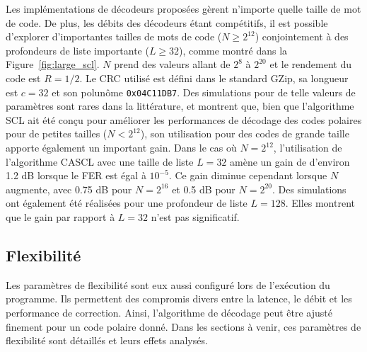 Les implémentations de décodeurs proposées gèrent n'importe quelle taille de mot de code. De plus, les débits des décodeurs étant compétitifs, il est possible d'explorer d'importantes tailles de mots de code ($N\geq2^{12}$) conjointement à des profondeurs de liste importante ($L \geq 32$), comme montré dans la Figure~\ref{fig:large_scl}. $N$ prend des valeurs allant de $2^8$ à $2^{20}$ et le rendement du code est $R=1/2$. Le CRC utilisé est défini dans le standard GZip, sa longueur est $c=32$ et son polunôme \texttt{0x04C11DB7}. Des simulations pour de telle valeurs de paramètres sont rares dans la littérature, et montrent que, bien que l'algorithme SCL ait été conçu pour améliorer les performances de décodage des codes polaires pour de petites tailles ($N<2^{12}$), son utilisation pour des codes de grande taille apporte également un important gain. Dans le cas où $N=2^{12}$, l'utilisation de l'algorithme CASCL avec une taille de liste $L=32$ amène un gain de d'environ 1.2 dB lorsque le FER est égal à $10^{-5}$. Ce gain diminue cependant lorsque $N$ augmente, avec 0.75 dB pour $N=2^{16}$ et 0.5 dB pour $N=2^{20}$. Des simulations ont également été réalisées pour une profondeur de liste $L=128$. Elles montrent que le gain par rapport à $L=32$ n'est pas significatif.

\subsection{Flexibilité}
Les paramètres de flexibilité sont eux aussi configuré lors de l'exécution du programme. Ils permettent des compromis divers entre la latence, le débit et les performance de correction. Ainsi, l'algorithme de décodage peut être ajusté finement pour un code polaire donné. Dans les sections à venir, ces paramètres de flexibilité sont détaillés et leurs effets analysés.

